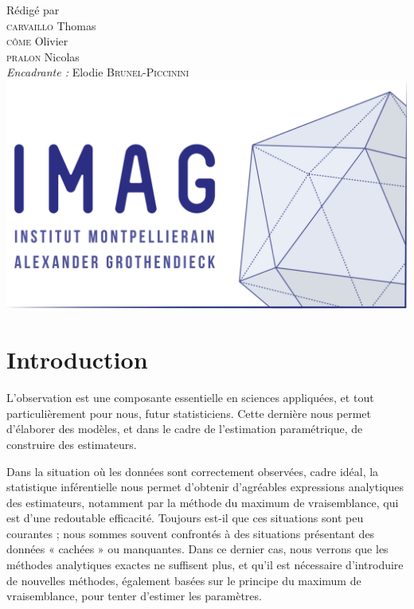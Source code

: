 \documentclass[frenchb]{report}
\newcommand{\1}{\mathbbm{1}}
\theoremstyle{definition}\newtheorem{defn}{Définition}
\theoremstyle{definition}\newtheorem{exm}{Exemple}
\theoremstyle{definition}\newtheorem{nota}{Notation}
\theoremstyle{definition}\newtheorem{rem}{Remarque}
\begin{document}
\begin{titlepage}
\begin{center}
{\large Rédigé par\\}
{\Large \textsc{carvaillo} Thomas}\\
{\Large \textsc{côme} Olivier}\\
{\Large \textsc{pralon} Nicolas}\\[1cm]
{\large \emph{Encadrante :} Elodie \textsc{Brunel-Piccinini}}\\[1.5cm] 

\includegraphics[scale=0.7]{imag_logo.png}

\end{center}
\end{titlepage}
\tableofcontents
\newpage

\chapter*{Introduction}

L'observation est une composante essentielle en sciences appliquées, et tout particulièrement pour nous, futur statisticiens. Cette dernière nous permet d’élaborer des modèles, et dans le cadre de l’estimation paramétrique, de construire des estimateurs.

Dans la situation où les données sont correctement observées, cadre idéal, la statistique inférentielle nous permet d’obtenir d’agréables expressions analytiques des estimateurs, notamment par la méthode du maximum de vraisemblance, qui est d'une redoutable efficacité. Toujours est-il que ces situations sont peu courantes ; nous sommes souvent confrontés à des situations présentant des données « cachées » ou manquantes. Dans ce dernier cas, nous verrons que les méthodes analytiques exactes ne suffisent plus, et qu’il est nécessaire d’introduire de nouvelles méthodes, également basées sur le principe du maximum de vraisemblance, pour tenter d’estimer les paramètres.
\end{document}
